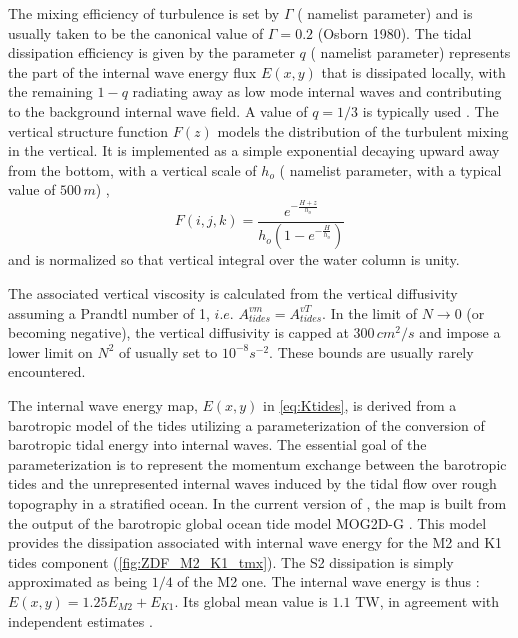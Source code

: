\documentclass[../tex_main/NEMO_manual]{subfiles}
\begin{document}
The mixing efficiency of turbulence is set by $\Gamma$ ( namelist parameter)
and is usually taken to be the canonical value of $\Gamma = 0.2$ (Osborn 1980). 
The tidal dissipation efficiency is given by the parameter $q$ ( namelist parameter) 
represents the part of the internal wave energy flux $E(x, y)$ that is dissipated locally, 
with the remaining $1-q$ radiating away as low mode internal waves and 
contributing to the background internal wave field. A value of $q=1/3$ is typically used  
\citet{St_Laurent_al_GRL02}.
The vertical structure function $F(z)$ models the distribution of the turbulent mixing in the vertical. 
It is implemented as a simple exponential decaying upward away from the bottom, 
with a vertical scale of $h_o$ ( namelist parameter, with a typical value of $500\,m$) \citep{St_Laurent_Nash_DSR04}, 
\begin{equation} \label{eq:Fz}
F(i,j,k) = \frac{ e^{ -\frac{H+z}{h_o} } }{ h_o \left( 1- e^{ -\frac{H}{h_o} } \right) }
\end{equation}
and is normalized so that vertical integral over the water column is unity. 

The associated vertical viscosity is calculated from the vertical 
diffusivity assuming a Prandtl number of 1, $i.e.$ $A^{vm}_{tides}=A^{vT}_{tides}$. 
In the limit of $N \rightarrow 0$ (or becoming negative), the vertical diffusivity 
is capped at $300\,cm^2/s$ and impose a lower limit on $N^2$ of  
usually set to $10^{-8} s^{-2}$. These bounds are usually rarely encountered.

The internal wave energy map, $E(x, y)$ in \autoref{eq:Ktides}, is derived 
from a barotropic model of the tides utilizing a parameterization of the 
conversion of barotropic tidal energy into internal waves. 
The essential goal of the parameterization is to represent the momentum 
exchange between the barotropic tides and the unrepresented internal waves 
induced by the tidal flow over rough topography in a stratified ocean. 
In the current version of \NEMO, the map is built from the output of 
the barotropic global ocean tide model MOG2D-G \citep{Carrere_Lyard_GRL03}.
This model provides the dissipation associated with internal wave energy for the M2 and K1 
tides component (\autoref{fig:ZDF_M2_K1_tmx}). The S2 dissipation is simply approximated
as being $1/4$ of the M2 one. The internal wave energy is thus : $E(x, y) = 1.25 E_{M2} + E_{K1}$. 
Its global mean value is $1.1$ TW, in agreement with independent estimates 
\citep{Egbert_Ray_Nat00, Egbert_Ray_JGR01}. 
\end{document}

